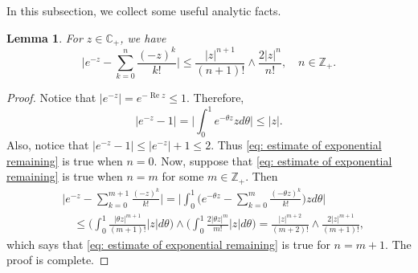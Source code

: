 \documentclass[12pt,a4paper]{amsart}
\theoremstyle{plain}
\newtheorem{lem}[thm]{Lemma}
\theoremstyle{definition}
\numberwithin{equation}{section}
\begin{document}
In this subsection, we collect some useful analytic facts.
\begin{lem}
\label{lem: estimate of exponential remaining}
 For  $z\in \mathbb C_+$,  we have
\begin{equation}
\label{eq: estimate of exponential remaining}
    \Big|e^{-z} - \sum_{k=0}^n \frac{(-z)^k}{k!} \Big|
    \leq \frac{|z|^{n+1}}{(n+1)!} \wedge \frac{2|z|^{n}}{n!}, \quad n\in \mathbb Z_+.
\end{equation}
\end{lem}
\begin{proof}
    Notice that $|e^{-z}| = e^{- \operatorname{Re} z} \leq 1$.
    Therefore,
\begin{equation}
    |e^{-z} - 1| = \Big| \int_0^1 e^{-\theta z} z d\theta\Big|
    \leq |z|.
\end{equation}
    Also, notice that $|e^{-z} - 1| \leq |e^{-z}|+1 \leq 2$.
    Thus \eqref{eq: estimate of exponential remaining} is true when $n = 0$.
    Now, suppose that \eqref{eq: estimate of exponential remaining} is true when $n = m$ for some $m \in \mathbb Z_+$.
 Then
\begin{equation}\begin{split}
    &\Big|e^{-z} - \sum_{k=0}^{m+1} \frac{(-z)^k}{k!}\Big|
    = \Big| \int_0^1\Big(e^{-\theta z} - \sum_{k=0}^m \frac{(-\theta z)^k}{k!} \Big) z d\theta \Big|
    \\&\quad \leq  \Big(\int_0^1 \frac{|\theta z|^{m+1}}{(m+1)!} |z| d\theta\Big) \wedge \Big(\int_0^1 \frac{2|\theta z|^{m}}{m!} |z| d\theta\Big)
    = \frac{|z|^{m+2}}{(m+2)!} \wedge \frac{2|z|^{m+1}}{(m+1)!},
\end{split}\end{equation}
    which says that \eqref{eq: estimate of exponential remaining} is true for $n = m + 1$.
    The proof is complete.
\end{proof}
\end{document}
